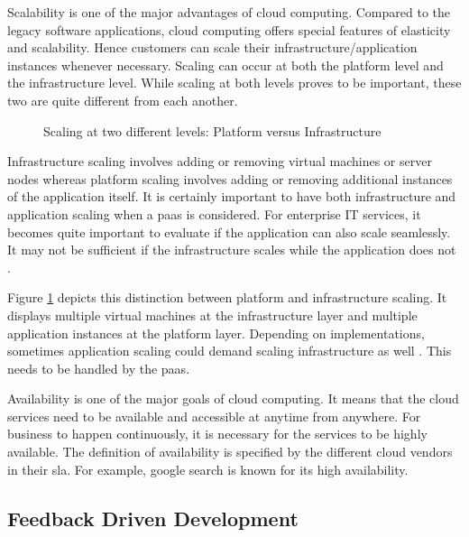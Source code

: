 \documentclass[article,type=msc,colorback,12pt,accentcolor=tud8b,table]{tudthesis}
\begin{document}
		Scalability is one of the major advantages of cloud computing. Compared to the legacy software applications, cloud computing offers special features of elasticity and scalability. Hence customers can scale their infrastructure/application instances whenever necessary. Scaling can occur at both the platform level and the infrastructure level. While scaling at both levels proves to be important, these two are quite different from each another. 
		
		\begin{figure}[!h]
			\begin{center}
				\makebox[\textwidth]{\texttt{[image: 2-2]}}
			\end{center}
			\caption{Scaling at two different levels: Platform versus Infrastructure}
			\label{fig:scaling_infra_platform}
		\end{figure}
		
		Infrastructure scaling involves adding or removing virtual machines or server nodes whereas platform scaling involves adding or removing additional instances of the application itself. It is certainly important to have both infrastructure and application scaling when a \gls{paas} is considered. For enterprise IT services, it becomes quite important to evaluate if the application can also scale seamlessly. It may not be sufficient if the infrastructure scales while the application does not \cite{app_infra_scale}. 
		
		Figure \ref{fig:scaling_infra_platform} depicts this distinction between platform and infrastructure scaling. It displays multiple virtual machines at the infrastructure layer and multiple application instances at the platform layer. Depending on implementations, sometimes application scaling could demand scaling infrastructure as well \cite{cf_scale}. This needs to be handled by the \gls{paas}. 
		
		\par Availability is one of the major goals of cloud computing. It means that the cloud services need to be available and accessible at anytime from anywhere. For business to happen continuously, it is necessary for the services to be highly available. The definition of availability is specified by the different cloud vendors in their \gls{sla}. For example, google search is known for its high availability.	
		
		\subsection{Feedback Driven Development } 		
		
\end{document}

